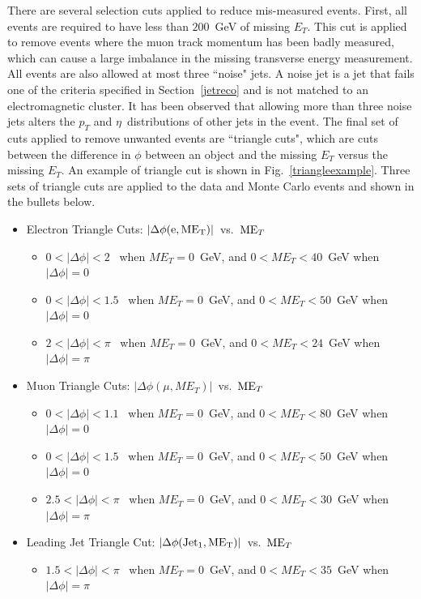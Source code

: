 There are several selection cuts applied to reduce mis-measured events. First, all events are required to have less than $200$~GeV of missing $E_{T}$. This cut is applied to remove events where the muon track momentum has been badly measured, which can cause a large imbalance in the missing transverse energy measurement. All events are also allowed at most three ``noise" jets. A noise jet is a jet that fails one of the criteria specified in Section~\ref{jetreco} and is not matched to an electromagnetic cluster. It has been observed that allowing more than three noise jets alters the $p_{T}$ and $\eta$~distributions of other jets in the event. The final set of cuts applied to remove unwanted events are ``triangle cuts", which are cuts between the difference in $\phi$ between an object and the missing $E_{T}$ versus the missing $E_{T}$. An example of triangle cut is shown in Fig.~\ref{triangleexample}. Three sets of triangle cuts are applied to the data and Monte Carlo events and shown in the bullets below.

\begin{itemize}
\item Electron Triangle Cuts: $|\Delta\phi(\rm{e},ME_{T})|$~vs.~$\mbox{ME$_{T}$}$
   \begin{itemize}
   \item $0<|\Delta\phi|<2$~ when $ME_{T} = 0$~GeV, and $0<ME_{T}<40$~GeV when $|\Delta\phi| = 0$
   \item $0<|\Delta\phi|<1.5$~ when $ME_{T} = 0$~GeV, and $0<ME_{T}<50$~GeV when $|\Delta\phi| = 0$
   \item  $2<|\Delta\phi|<\pi$~ when $ME_{T} = 0$~GeV, and $0<ME_{T}<24$~GeV when $|\Delta\phi| = \pi$
   \end{itemize}
\item Muon Triangle Cuts: $|\Delta\phi(\mu,ME_{T})|$~vs.~$\mbox{ME$_{T}$}$
   \begin{itemize}
   \item  $0<|\Delta\phi|<1.1$~ when $ME_{T} = 0$~GeV, and $0<ME_{T}<80$~GeV when $|\Delta\phi| = 0$
   \item  $0<|\Delta\phi|<1.5$~ when $ME_{T} = 0$~GeV, and $0<ME_{T}<50$~GeV when $|\Delta\phi| = 0$
   \item $2.5<|\Delta\phi|<\pi$~ when $ME_{T} = 0$~GeV, and $0<ME_{T}<30$~GeV when $|\Delta\phi| = \pi$
   \end{itemize}
\item Leading Jet Triangle Cut: $|\Delta\phi(\rm{Jet_{1}},ME_{T})|$~vs.~$\mbox{ME$_{T}$}$
   \begin{itemize}
   \item $1.5<|\Delta\phi|<\pi$~ when $ME_{T} = 0$~GeV, and $0<ME_{T}<35$~GeV when $|\Delta\phi| = \pi$
   \end{itemize}
\end{itemize}



